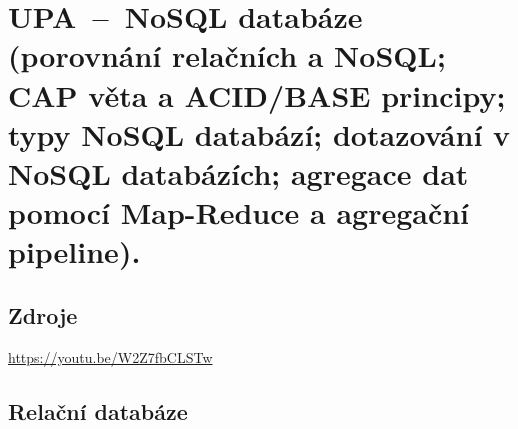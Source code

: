 

\graphicspath{{upa/nosql/figures}}


\chapter{UPA~--~NoSQL databáze (porovnání relačních a NoSQL; CAP věta a ACID/BASE principy; typy NoSQL databází; dotazování v NoSQL databázích; agregace dat pomocí Map-Reduce a agregační pipeline).}


\section{Zdroje}

\begin{compactitem}
    \item {}
    \item {}
    \item \url{https://youtu.be/W2Z7fbCLSTw}
\end{compactitem}


\section{Relační databáze}

